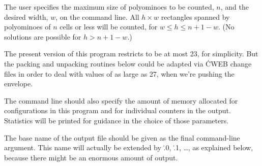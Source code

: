 The user specifies the maximum size of polyominoes to be counted, $n$,
and the desired width, $w$, on the command line. All $h\times w$ rectangles
spanned by polyominoes of $n$ cells or less will be counted, for
$w\le h\le n+1-w$. (No solutions are possible for $h>n+1-w$.)

The present version of this program restricts  to be at most
23, for simplicity. But the packing and unpacking routines below could be
adapted via \.{CWEB} change files in order to deal with
values of  as large as 27, when we're pushing the envelope.

The command line should also specify the amount of memory allocated for
configurations in this program and for individual counters in the output.
Statistics will be printed for guidance in the choice of those parameters.

The base name of the output file should be given as the final command-line
argument. This name will actually be extended by \.{.0}, \.{.1}, \dots,
as explained below, because there might be an enormous amount of output.


